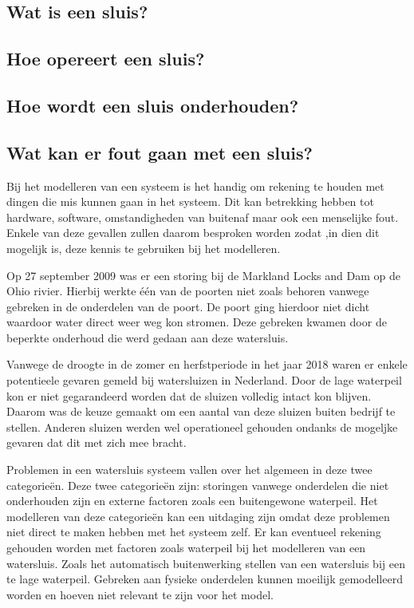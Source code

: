 \documentclass[../verslag.tex]{subfiles}
\begin{document}
\subsection{Wat is een sluis?}

\subsection{Hoe opereert een sluis?}

\subsection{Hoe wordt een sluis onderhouden?}

\subsection{Wat kan er fout gaan met een sluis?}
Bij het modelleren van een systeem is het handig om rekening te houden met dingen die mis kunnen gaan in het systeem.
Dit kan betrekking hebben tot hardware, software, omstandigheden van buitenaf maar ook een menselijke fout.
Enkele van deze gevallen zullen daarom besproken worden zodat ,in dien dit mogelijk is, deze kennis te gebruiken bij het modelleren.

Op 27 september 2009 was er een storing bij de Markland Locks and Dam op de Ohio rivier. 
Hierbij werkte één van de poorten niet zoals behoren vanwege gebreken in de onderdelen van de poort\cite{herald-dispatch_2009}.  
De poort ging hierdoor niet dicht waardoor water direct weer weg kon stromen.
Deze gebreken kwamen door de beperkte onderhoud die werd gedaan aan deze watersluis.

Vanwege de droogte in de zomer en herfstperiode in het jaar 2018 waren er enkele potentieele gevaren gemeld bij watersluizen in Nederland\cite{poelgeest_2020}.
Door de lage waterpeil kon er niet gegarandeerd worden dat de sluizen volledig intact kon blijven.
Daarom was de keuze gemaakt om een aantal van deze sluizen buiten bedrijf te stellen.
Anderen sluizen werden wel operationeel gehouden ondanks de mogeljke gevaren dat dit met zich mee bracht.

Problemen in een watersluis systeem vallen over het algemeen in deze twee categorieën. 
Deze twee categorieën zijn: storingen vanwege onderdelen die niet onderhouden zijn en externe factoren zoals een buitengewone waterpeil.
Het modelleren van deze categorieën kan een uitdaging zijn omdat deze problemen niet direct te maken hebben met het systeem zelf.
Er kan eventueel rekening gehouden worden met factoren zoals waterpeil bij het modelleren van een watersluis. 
Zoals het automatisch buitenwerking stellen van een watersluis bij een te lage waterpeil. 
Gebreken aan fysieke onderdelen kunnen moeilijk gemodelleerd worden en hoeven niet relevant te zijn voor het model.
\end{document}
